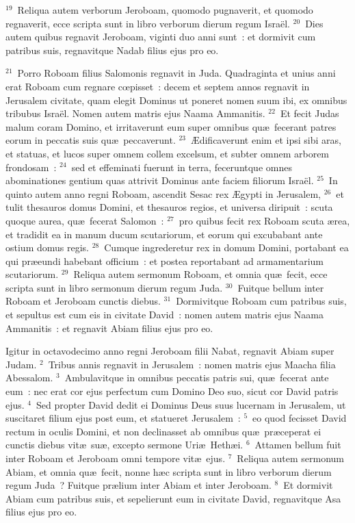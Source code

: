 ${}^{19}$~Reliqua autem verborum Jeroboam, quomodo pugnaverit, et quomodo regnaverit, ecce scripta sunt in libro verborum dierum regum Isra\"el.
${}^{20}$~Dies autem quibus regnavit Jeroboam, viginti duo anni sunt~: et dormivit cum patribus suis, regnavitque Nadab filius ejus pro eo.


${}^{21}$~Porro Roboam filius Salomonis regnavit in Juda. Quadraginta et unius anni erat Roboam cum regnare cœpisset~: decem et septem annos regnavit in Jerusalem civitate, quam elegit Dominus ut poneret nomen suum ibi, ex omnibus tribubus Isra\"el. Nomen autem matris ejus Naama Ammanitis.
${}^{22}$~Et fecit Judas malum coram Domino, et irritaverunt eum super omnibus qu\ae\ fecerant patres eorum in peccatis suis qu\ae\ peccaverunt.
${}^{23}$~\AE dificaverunt enim et ipsi sibi aras, et statuas, et lucos super omnem collem excelsum, et subter omnem arborem frondosam~:
${}^{24}$~sed et effeminati fuerunt in terra, feceruntque omnes abominationes gentium quas attrivit Dominus ante faciem filiorum Isra\"el.
${}^{25}$~In quinto autem anno regni Roboam, ascendit Sesac rex \AE gypti in Jerusalem,
${}^{26}$~et tulit thesauros domus Domini, et thesauros regios, et universa diripuit~: scuta quoque aurea, qu\ae\ fecerat Salomon~:
${}^{27}$~pro quibus fecit rex Roboam scuta \ae rea, et tradidit ea in manum ducum scutariorum, et eorum qui excubabant ante ostium domus regis.
${}^{28}$~Cumque ingrederetur rex in domum Domini, portabant ea qui pr\ae eundi habebant officium~: et postea reportabant ad armamentarium scutariorum.
${}^{29}$~Reliqua autem sermonum Roboam, et omnia qu\ae\ fecit, ecce scripta sunt in libro sermonum dierum regum Juda.
${}^{30}$~Fuitque bellum inter Roboam et Jeroboam cunctis diebus.
${}^{31}$~Dormivitque Roboam cum patribus suis, et sepultus est cum eis in civitate David~: nomen autem matris ejus Naama Ammanitis~: et regnavit Abiam filius ejus pro eo.

\bchapter
\lettrine[lines=3,image=true,loversize=0.05,lraise=-0.03]{I}{}gitur in octavodecimo anno regni Jeroboam filii Nabat, regnavit Abiam super Judam.
${}^{2}$~Tribus annis regnavit in Jerusalem~: nomen matris ejus Maacha filia Abessalom.
${}^{3}$~Ambulavitque in omnibus peccatis patris sui, qu\ae\ fecerat ante eum~: nec erat cor ejus perfectum cum Domino Deo suo, sicut cor David patris ejus.
${}^{4}$~Sed propter David dedit ei Dominus Deus suus lucernam in Jerusalem, ut suscitaret filium ejus post eum, et statueret Jerusalem~:
${}^{5}$~eo quod fecisset David rectum in oculis Domini, et non declinasset ab omnibus qu\ae\ pr\ae ceperat ei cunctis diebus vit\ae\ su\ae , excepto sermone Uri\ae\ Heth\ae i.
${}^{6}$~Attamen bellum fuit inter Roboam et Jeroboam omni tempore vit\ae\ ejus.
${}^{7}$~Reliqua autem sermonum Abiam, et omnia qu\ae\ fecit, nonne h\ae c scripta sunt in libro verborum dierum regum Juda~? Fuitque pr\ae lium inter Abiam et inter Jeroboam.
${}^{8}$~Et dormivit Abiam cum patribus suis, et sepelierunt eum in civitate David, regnavitque Asa filius ejus pro eo.


